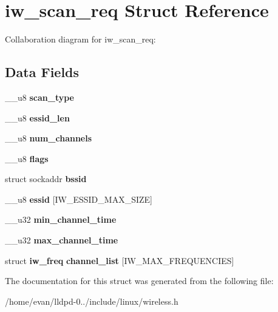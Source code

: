 \section{iw\-\_\-scan\-\_\-req \-Struct \-Reference}
\label{structiw__scan__req}


\-Collaboration diagram for iw\-\_\-scan\-\_\-req\-:
\subsection*{\-Data \-Fields}
\begin{DoxyCompactItemize}
\item 
\-\_\-\-\_\-u8 {\bfseries scan\-\_\-type}\label{structiw__scan__req_a33b7c6a7a6d3349684853d0baab77e78}

\item 
\-\_\-\-\_\-u8 {\bfseries essid\-\_\-len}\label{structiw__scan__req_a53c0efa754307e51c8a87a1ec13cbb4d}

\item 
\-\_\-\-\_\-u8 {\bfseries num\-\_\-channels}\label{structiw__scan__req_aae7c11389151c749939289bcd149ca2d}

\item 
\-\_\-\-\_\-u8 {\bfseries flags}\label{structiw__scan__req_a1ff0cbb99303f78cddccfc98582c5bf3}

\item 
struct sockaddr {\bfseries bssid}\label{structiw__scan__req_a183880506ceb65b79693d9daf7875a08}

\item 
\-\_\-\-\_\-u8 {\bfseries essid} [\-I\-W\-\_\-\-E\-S\-S\-I\-D\-\_\-\-M\-A\-X\-\_\-\-S\-I\-Z\-E]\label{structiw__scan__req_a263615f627ca6935c5f1b01ff7049458}

\item 
\-\_\-\-\_\-u32 {\bfseries min\-\_\-channel\-\_\-time}\label{structiw__scan__req_a0426626b81a927ed215af2f4f9d594a1}

\item 
\-\_\-\-\_\-u32 {\bfseries max\-\_\-channel\-\_\-time}\label{structiw__scan__req_a72e0ad963de7fde47a16172ad140fcea}

\item 
struct {\bf iw\-\_\-freq} {\bfseries channel\-\_\-list} [\-I\-W\-\_\-\-M\-A\-X\-\_\-\-F\-R\-E\-Q\-U\-E\-N\-C\-I\-E\-S]\label{structiw__scan__req_a399aa45293b9e7ed631c9876eaab2bdf}

\end{DoxyCompactItemize}


\-The documentation for this struct was generated from the following file\-:\begin{DoxyCompactItemize}
\item 
/home/evan/lldpd-\/0../include/linux/wireless.\-h\end{DoxyCompactItemize}
